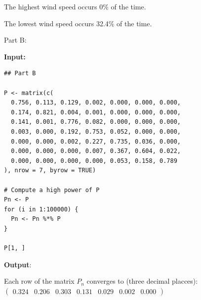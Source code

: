 \documentclass[hidelinks]{article}
\begin{document}
\noindent The highest wind speed occurs 0\% of the time.

\noindent The lowest wind speed occurs 32.4\% of the time.

\medskip

\noindent Part B:

\noindent \textbf{Input:}

\begin{lstlisting}[caption={Hourly Wind Speeds of a Region In Turkey}]
## Part B

P <- matrix(c(
  0.756, 0.113, 0.129, 0.002, 0.000, 0.000, 0.000,
  0.174, 0.821, 0.004, 0.001, 0.000, 0.000, 0.000,
  0.141, 0.001, 0.776, 0.082, 0.000, 0.000, 0.000,
  0.003, 0.000, 0.192, 0.753, 0.052, 0.000, 0.000,
  0.000, 0.000, 0.002, 0.227, 0.735, 0.036, 0.000,
  0.000, 0.000, 0.000, 0.007, 0.367, 0.604, 0.022,
  0.000, 0.000, 0.000, 0.000, 0.053, 0.158, 0.789
), nrow = 7, byrow = TRUE)

# Compute a high power of P
Pn <- P
for (i in 1:100000) {
  Pn <- Pn %*% P
}

P[1, ]
\end{lstlisting}

\noindent \textbf{Output}:

\noindent Each row of the matrix $P_{n}$ converges to (three decimal placces): $\begin{pmatrix}
0.324 & 0.206 & 0.303 & 0.131 & 0.029 & 0.002 & 0.000
\end{pmatrix}$
\end{document}
